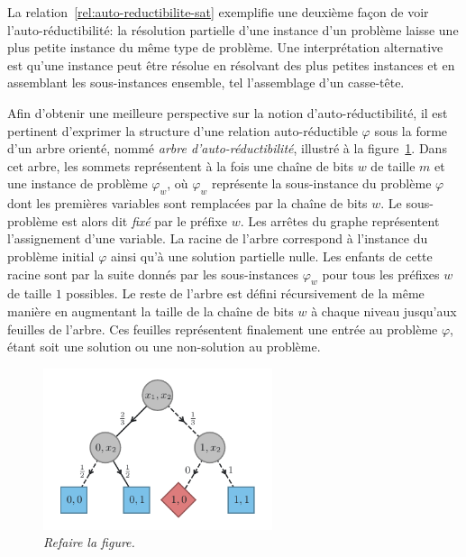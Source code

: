 La relation~\ref{rel:auto-reductibilite-sat} exemplifie une deuxième façon de voir l'auto-réductibilité: la résolution partielle d'une instance d'un problème laisse une plus petite instance du même type de problème. Une interprétation alternative est qu'une instance peut être résolue en résolvant des plus petites instances et en assemblant les sous-instances ensemble, tel l'assemblage d'un casse-tête. 

Afin d'obtenir une meilleure perspective sur la notion d'auto-réductibilité, il est pertinent d'exprimer la structure d'une relation auto-réductible $\varphi$ sous la forme d'un arbre orienté, nommé \textit{arbre d'auto-réductibilité}, illustré à la figure~\ref{fig:arbre-auto-reductibilite}. Dans cet arbre, les sommets représentent à la fois une chaîne de bits $w$ de taille $m$ et une instance de problème $\varphi_{w}$, où $\varphi_{w}$ représente la sous-instance du problème $\varphi$ dont les premières variables sont remplacées par la chaîne de bits $w$. Le sous-problème est alors dit \textit{fixé} par le préfixe $w$. Les arrêtes du graphe représentent l'assignement d'une variable. La racine de l'arbre correspond à l'instance du problème initial $\varphi$ ainsi qu'à une solution partielle nulle. Les enfants de cette racine sont par la suite donnés par les sous-instances $\varphi_{w}$ pour tous les préfixes $w$ de taille $1$ possibles. Le reste de l'arbre est défini récursivement de la même manière en augmentant la taille de la chaîne de bits $w$ à chaque niveau jusqu'aux feuilles de l'arbre. Ces feuilles représentent finalement une entrée au problème $\varphi$, étant soit une solution ou une non-solution au problème.

\begin{figure}[h!]
    \centering
    \includegraphics[width=0.6\textwidth]{figures/jvv-algorithm.pdf}
    \caption[Arbre d'auto-réductibilité]{\textcolor{mydarkred}{\textit{Refaire la figure.}}}
    \label{fig:arbre-auto-reductibilite}
\end{figure}

